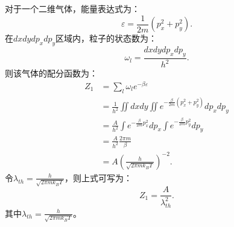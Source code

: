\documentclass[a4paper,12pt]{article}
\begin{document}
\section{}
对于一个二维气体，能量表达式为：
\begin{equation}\nonumber
	\varepsilon = \frac{1}{2m}\left( p_x^2 + p_y^2 \right).
\end{equation}
在$dx dy dp_x dp_y$区域内，粒子的状态数为：
\begin{equation}\nonumber
	\omega_l = \frac{dx dy dp_x dp_y}{h^2}.
\end{equation}
则该气体的配分函数为：
\begin{equation}\nonumber
\begin{aligned}
	Z_1 &= \sum_l \omega_l e^{-\beta \varepsilon} \\
	&= \frac{1}{h^2} \iint dx dy \iint e^{-\frac{\beta}{2m}\left( p_x^2 + p_y^2 \right)} dp_x dp_y \\
	&= \frac{A}{h^2} \int e^{-\frac{\beta}{2m}p_x^2} dp_x \int e^{-\frac{\beta}{2m}p_y^2} dp_y \\
	&= \frac{A}{h^2} \frac{2\pi m}{\beta} \\
	&= A \left( \frac{h}{\sqrt{2\pi mk_B T}} \right)^{-2}.
\end{aligned}
\end{equation}
令$\lambda_{th} = \frac{h}{\sqrt{2\pi mk_B T}}$，则上式可写为：
\begin{equation}\nonumber
	Z_1 = \frac{A}{\lambda_{th}^2}.
\end{equation}
其中$\lambda_{th} = \frac{h}{\sqrt{2\pi mk_B T}}$。
\end{document}
